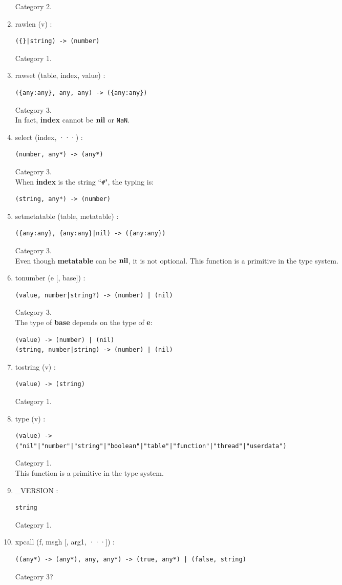 \begin{enumerate}
Category 2.
\item rawlen (v) :
\begin{verbatim}
({}|string) -> (number)
\end{verbatim}
Category 1.
\item rawset (table, index, value) :
\begin{verbatim}
({any:any}, any, any) -> ({any:any})
\end{verbatim}
Category 3.
\\
In fact, \textbf{index} cannot be $\mathbf{nil}$ or \texttt{NaN}.
\item select (index, ···) :
\begin{verbatim}
(number, any*) -> (any*)
\end{verbatim}
Category 3.
\\
When \textbf{index} is the string ``\texttt{\#}", the typing is:
\begin{verbatim}
(string, any*) -> (number)
\end{verbatim}
\item setmetatable (table, metatable) :
\begin{verbatim}
({any:any}, {any:any}|nil) -> ({any:any}) 
\end{verbatim}
Category 3.
\\
Even though \textbf{metatable} can be $\mathbf{nil}$, it is not optional.
This function is a primitive in the type system.
\item tonumber (e [, base]) :
\begin{verbatim}
(value, number|string?) -> (number) | (nil)
\end{verbatim}
Category 3.
\\
The type of \textbf{base} depends on the type of \textbf{e}:
\begin{verbatim}
(value) -> (number) | (nil)
(string, number|string) -> (number) | (nil)
\end{verbatim}
\item tostring (v) :
\begin{verbatim}
(value) -> (string)
\end{verbatim}
Category 1.
\item type (v) :
\begin{verbatim}
(value) ->
("nil"|"number"|"string"|"boolean"|"table"|"function"|"thread"|"userdata")
\end{verbatim}
Category 1.
\\
This function is a primitive in the type system.
\item \_VERSION :
\begin{verbatim}
string
\end{verbatim}
Category 1.
\item xpcall (f, msgh [, arg1, ···]) :
\begin{verbatim}
((any*) -> (any*), any, any*) -> (true, any*) | (false, string)
\end{verbatim}
Category 3?
\end{enumerate}

